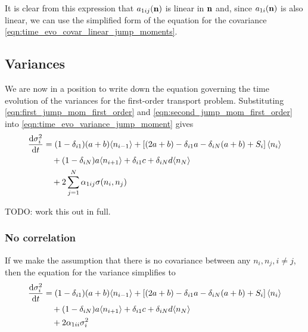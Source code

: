 It is clear from this expression that \(a_{1ij}(\mathbf{n})\) is linear in \(\mathbf{n}\)
and, since \(a_{1i}(\mathbf{n})\) is also linear, we can use the simplified form of
the equation for the covariance \eqref{eqn:time_evo_covar_linear_jump_moments}.

\subsection{Variances}
We are now in a position to write down the equation governing the time
evolution of the variances for the first-order transport problem. Substituting
\eqref{eqn:first_jump_mom_first_order} and
\eqref{eqn:second_jump_mom_first_order} into
\eqref{eqn:time_evo_variance_jump_moment} gives
\begin{equation}
    \begin{aligned}
        \frac{\mathrm{d} \sigma_i^2}{\mathrm{d} t} &= (1-\delta_{i1})(a+b)\langle n_{i-1} \rangle +
        \left[(2a+b) - \delta_{i1}a - \delta_{iN}(a+b) + S_i\right]\langle n_i \rangle\\
        &\quad+ (1-\delta_{iN})a\langle n_{i+1} \rangle + \delta_{i1}c + \delta_{iN}d \langle n_N \rangle\\
        &\quad+ 2 \sum_{j=1}^N \alpha_{1ij} \sigma(n_i,n_j)
    \end{aligned}
    \label{eqn:time_evo_variance_first_order}
\end{equation}

TODO: work this out in full.

\subsubsection{No correlation}
If we make the assumption that there is no covariance between any \(n_i, n_j,
i\neq j\), then the equation for the variance simplifies to
\begin{equation}
    \begin{aligned}
        \frac{\mathrm{d} \sigma_i^2}{\mathrm{d} t} &= (1-\delta_{i1})(a+b)\langle n_{i-1} \rangle +
        \left[(2a+b) - \delta_{i1}a - \delta_{iN}(a+b) + S_i\right]\langle n_i \rangle\\
        &\quad+ (1-\delta_{iN})a\langle n_{i+1} \rangle + \delta_{i1}c + \delta_{iN}d \langle n_N \rangle\\
        &\quad+ 2 \alpha_{1ii} \sigma_i^2
    \end{aligned}
    \label{eqn:time_evo_variance_first_order_no_corr}
\end{equation}


